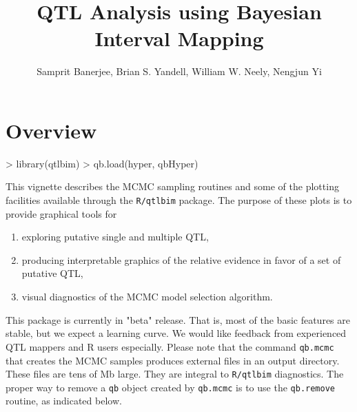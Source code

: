\documentclass{article}
\begin{document}
\title{\textbf{QTL} Analysis using \textbf{B}ayesian \textbf{I}nterval \textbf{M}apping}
\author{Samprit Banerjee, Brian S. Yandell, William W. Neely, Nengjun Yi}
\maketitle





\section{Overview}

\begin{Schunk}
\begin{Sinput}
> library(qtlbim)
> qb.load(hyper, qbHyper)
\end{Sinput}
\end{Schunk}

This vignette describes the MCMC sampling routines and some of the plotting
facilities available through the \texttt{R/qtlbim} package.  The
purpose of these plots is to provide graphical tools for 
\begin{enumerate}
\item exploring putative single and multiple QTL,
\item producing interpretable graphics of the relative evidence in
favor of a set of putative QTL,
\item visual diagnostics of the MCMC model selection algorithm.
\end{enumerate}  

This package is currently in "beta" release. That is, most of the
basic features are stable, but we expect a learning curve. We would
like feedback from experienced QTL mappers and R users
especially. Please note that the command \texttt{qb.mcmc} that creates
the MCMC samples produces external files in an output directory. These
files are tens of Mb large. They are integral to \texttt{R/qtlbim}
diagnostics. The proper way to remove a \texttt{qb} object created by
\texttt{qb.mcmc} is to use the \texttt{qb.remove} routine, as
indicated below. 
\end{document}
